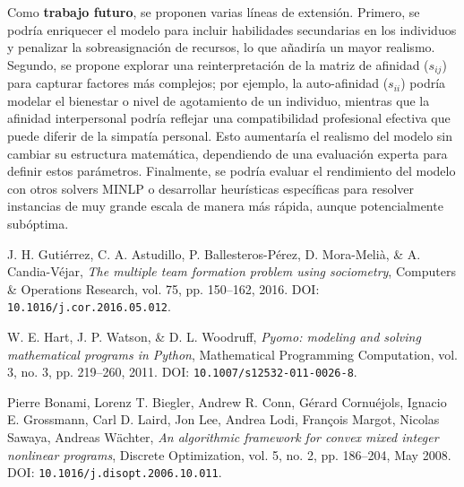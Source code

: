 \documentclass[conference]{IEEEtran}
\begin{document}
Como \textbf{trabajo futuro}, se proponen varias líneas de extensión. Primero, se podría enriquecer el modelo para incluir habilidades secundarias en los individuos y penalizar la sobreasignación de recursos, lo que añadiría un mayor realismo. Segundo, se propone explorar una reinterpretación de la matriz de afinidad ($s_{ij}$) para capturar factores más complejos; por ejemplo, la auto-afinidad ($s_{ii}$) podría modelar el bienestar o nivel de agotamiento de un individuo, mientras que la afinidad interpersonal podría reflejar una compatibilidad profesional efectiva que puede diferir de la simpatía personal. Esto aumentaría el realismo del modelo sin cambiar su estructura matemática, dependiendo de una evaluación experta para definir estos parámetros. Finalmente, se podría evaluar el rendimiento del modelo con otros solvers MINLP o desarrollar heurísticas específicas para resolver instancias de muy grande escala de manera más rápida, aunque potencialmente subóptima.


\begin{thebibliography}{00}

    J. H. Gutiérrez, C. A. Astudillo, P. Ballesteros-Pérez, D. Mora-Melià, \& A. Candia-Véjar,
    \textit{The multiple team formation problem using sociometry},
    Computers \& Operations Research, vol. 75, pp. 150--162, 2016. DOI: \texttt{10.1016/j.cor.2016.05.012}.

    W. E. Hart, J. P. Watson, \& D. L. Woodruff,
    \textit{Pyomo: modeling and solving mathematical programs in Python},
    Mathematical Programming Computation, vol. 3, no. 3, pp. 219--260, 2011. DOI: \texttt{10.1007/s12532-011-0026-8}.


    Pierre Bonami, Lorenz T. Biegler, Andrew R. Conn, Gérard Cornuéjols, Ignacio E. Grossmann, Carl D. Laird, Jon Lee, Andrea Lodi, François Margot, Nicolas Sawaya, Andreas Wächter,
    \textit{An algorithmic framework for convex mixed integer nonlinear programs},
    Discrete Optimization, vol. 5, no. 2, pp. 186--204, May 2008. DOI: \texttt{10.1016/j.disopt.2006.10.011}.

\end{thebibliography}
\end{document}
